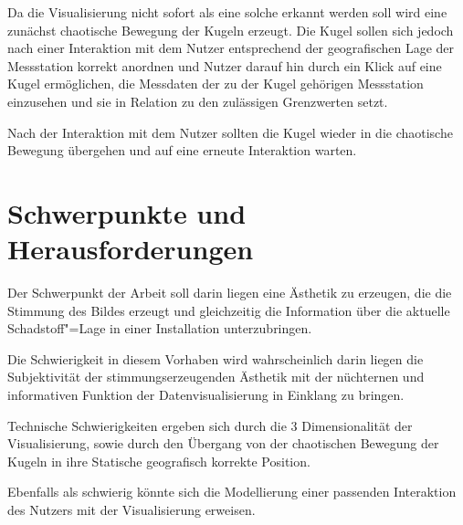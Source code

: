 \documentclass[12pt]{article} %
\begin{document}
Da die Visualisierung nicht sofort als eine solche erkannt werden soll wird eine zunächst chaotische Bewegung der Kugeln erzeugt.
Die Kugel sollen sich jedoch nach einer Interaktion mit dem Nutzer entsprechend der geografischen Lage der Messstation korrekt anordnen und Nutzer darauf hin durch ein Klick auf eine Kugel ermöglichen, die Messdaten der zu der Kugel gehörigen Messstation einzusehen und sie in Relation zu den zulässigen Grenzwerten setzt.

Nach der Interaktion mit dem Nutzer sollten die Kugel wieder in die chaotische Bewegung übergehen und auf eine erneute Interaktion warten.

\section{Schwerpunkte und Herausforderungen} \label{sec:Schwerpunkte}

Der Schwerpunkt der Arbeit soll darin liegen eine Ästhetik zu erzeugen, die die Stimmung des Bildes erzeugt und gleichzeitig die Information über die aktuelle Schadstoff"=Lage in einer Installation unterzubringen.

Die Schwierigkeit in diesem Vorhaben wird wahrscheinlich darin liegen die Subjektivität der stimmungserzeugenden Ästhetik mit der nüchternen und informativen Funktion der Datenvisualisierung in Einklang zu bringen.

Technische Schwierigkeiten ergeben sich durch die 3 Dimensionalität der Visualisierung, sowie durch den Übergang von der chaotischen Bewegung der Kugeln in ihre Statische geografisch korrekte Position.

Ebenfalls als schwierig könnte sich die Modellierung einer passenden Interaktion des Nutzers mit der Visualisierung erweisen.



\end{document}
